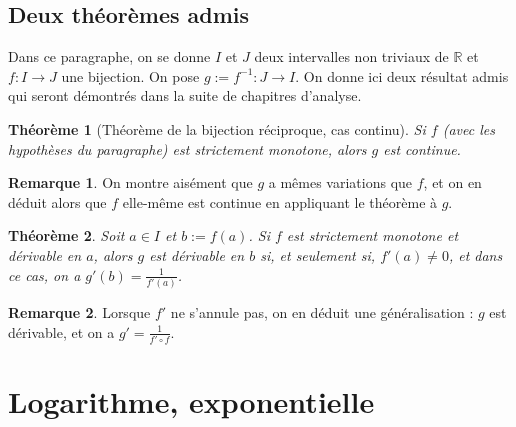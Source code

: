 \documentclass[french]{book}
\newcommand{\R}{\mathbb{R}}
\newcommand{\inv}{^{-1}}
\theoremstyle{plain}
\newtheorem{thm}{Théorème}[chapter]
\theoremstyle{definition}
\newtheorem{rmq}{Remarque}[chapter]
\theoremstyle{remark}
\begin{document}
\subsection{Deux théorèmes admis}
Dans ce paragraphe, on se donne $I$ et $J$ deux intervalles non triviaux de $\R$ et $f:I\rightarrow J$ une bijection. On pose $g:=f\inv:J\rightarrow I$. On donne ici deux résultat admis qui seront démontrés dans la suite de chapitres d'analyse.
\begin{thm}[Théorème de la bijection réciproque, cas continu]
	Si $f$ (avec les hypothèses du paragraphe) est strictement monotone, alors $g$ est continue.
\end{thm}
\begin{rmq}
	On montre aisément que $g$ a mêmes variations que $f$, et on en déduit alors que $f$ elle-même est continue en appliquant le théorème à $g$.
\end{rmq}
\begin{thm}
	Soit $a\in I$ et $b:=f(a)$. Si $f$ est strictement monotone et dérivable en $a$, alors $g$ est dérivable en $b$ si, et seulement si, $f'(a)\ne0$, et dans ce cas, on a $g'(b)=\displaystyle\frac{1}{f'(a)}$.
\end{thm}
\begin{rmq}
	Lorsque $f'$ ne s'annule pas, on en déduit une généralisation : $g$ est dérivable, et on a $g'=\displaystyle\frac{1}{f'\circ f}$.
\end{rmq}
\section{Logarithme, exponentielle}
\end{document}
